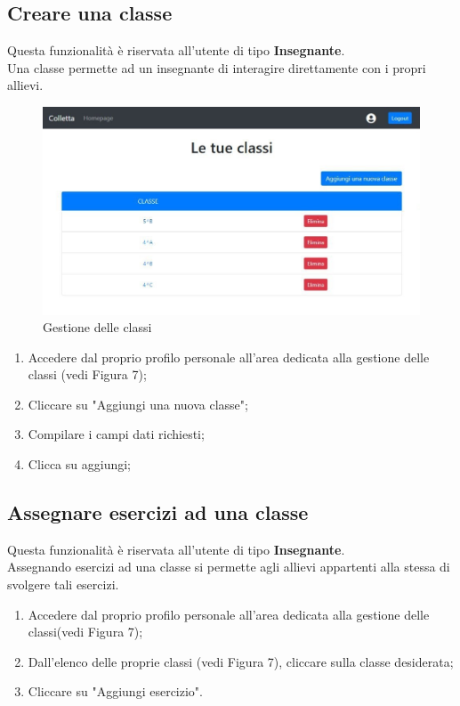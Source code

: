 \documentclass[11pt,a4paper]{article}
\begin{document}
{			
	\subsection{Creare una classe}
			Questa funzionalità è riservata all'utente di tipo \textbf{Insegnante}.\\
			Una classe permette ad un insegnante di interagire direttamente con i propri allievi.
				\begin{figure}[h!]
				\centering
				\includegraphics[scale=0.65]{images/classi.jpg}
				\caption{Gestione delle classi}
			\end{figure}
					\begin{enumerate}
			\item Accedere dal proprio profilo personale all'area dedicata alla gestione delle classi (vedi Figura 7);
			\item Cliccare su "Aggiungi una nuova classe";
			\item Compilare i campi dati richiesti;
			\item Clicca su aggiungi;
		\end{enumerate}
	\subsection{Assegnare esercizi ad una classe}
			Questa funzionalità è riservata all'utente di tipo \textbf{Insegnante}.\\
			Assegnando esercizi ad una classe si permette agli allievi appartenti alla stessa di svolgere tali esercizi.
			\begin{enumerate}
				\item Accedere dal proprio profilo personale all'area dedicata alla gestione delle classi(vedi Figura 7);
				\item Dall'elenco delle proprie classi (vedi Figura 7), cliccare sulla classe desiderata;
				\item Cliccare su "Aggiungi esercizio".
			\end{enumerate}
		
}
\end{document}
